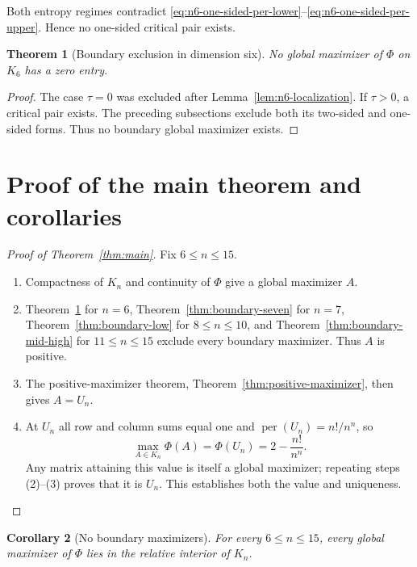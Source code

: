 \documentclass[11pt,a4paper]{article}
\numberwithin{equation}{section}
\newtheorem{theorem}{Theorem}[section]
\newtheorem{corollary}[theorem]{Corollary}
\theoremstyle{definition}
\newcommand{\per}{\operatorname{per}}
\newcommand{\1}{\mathbf{1}}
\begin{document}
Both entropy regimes contradict
\eqref{eq:n6-one-sided-per-lower}--\eqref{eq:n6-one-sided-per-upper}.
Hence no one-sided critical pair exists.

\begin{theorem}[Boundary exclusion in dimension six]
\label{thm:boundary-six}
No global maximizer of $\Phi$ on $K_6$ has a zero entry.
\end{theorem}

\begin{proof}
The case $\tau=0$ was excluded after Lemma~\ref{lem:n6-localization}.  If
$\tau>0$, a critical pair exists.  The preceding subsections exclude both
its two-sided and one-sided forms.  Thus no boundary global maximizer exists.
\end{proof}



\section{Proof of the main theorem and corollaries}\label{sec:completion}

\begin{proof}[Proof of Theorem~\ref{thm:main}]
Fix $6\le n\le15$.
\begin{enumerate}[label=\textup{(\arabic*)},leftmargin=2.4em]
\item Compactness of $K_n$ and continuity of $\Phi$ give a global maximizer
$A$.
\item Theorem~\ref{thm:boundary-six} for $n=6$,
Theorem~\ref{thm:boundary-seven} for $n=7$,
Theorem~\ref{thm:boundary-low} for $8\le n\le10$, and
Theorem~\ref{thm:boundary-mid-high} for $11\le n\le15$ exclude every
boundary maximizer.  Thus $A$ is positive.
\item The positive-maximizer theorem, Theorem~\ref{thm:positive-maximizer},
then gives $A=U_n$.
\item At $U_n$ all row and column sums equal one and
$\per(U_n)=n!/n^n$, so
\[
 \max_{A\in K_n}\Phi(A)=\Phi(U_n)=2-\frac{n!}{n^n}.
\]
Any matrix attaining this value is itself a global maximizer; repeating
steps (2)--(3) proves that it is $U_n$.  This establishes both the value and
uniqueness.
\end{enumerate}
\end{proof}

\begin{corollary}[No boundary maximizers]\label{cor:no-boundary}
For every $6\le n\le15$, every global maximizer of $\Phi$ lies in the relative interior of $K_n$.
\end{corollary}
\end{document}
